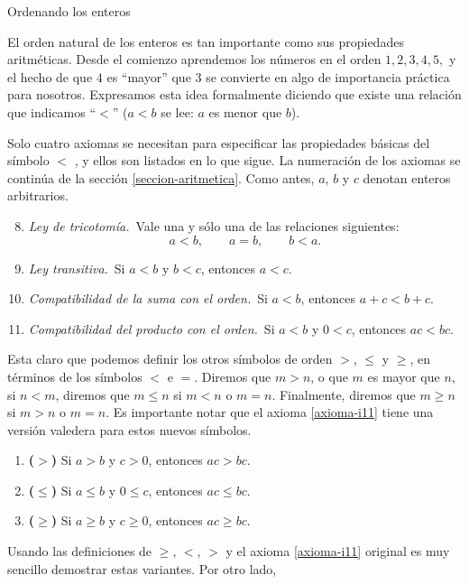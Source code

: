 \begin{section}{Ordenando los enteros}\label{seccion-ordenando-los-enteros}

El orden natural de los enteros es tan importante como sus propiedades aritméticas. Desde el comienzo aprendemos los números en el orden $1, 2, 3, 4, 5,$ y el hecho de que $4$ es ``mayor'' que $3$ se convierte en algo de importancia práctica para nosotros. Expresamos esta idea formalmente diciendo que existe una relación que indicamos ``$<$'' ($a < b$ se lee: $a$ es menor que $b$). 

Solo cuatro axiomas se necesitan para especificar las propiedades básicas del símbolo $<$ , y ellos son listados en lo que sigue. La numeración de los axiomas se continúa de la sección \ref{seccion-aritmetica}. Como antes, $a$, $b$ y $c$ denotan enteros arbitrarios.

\begin{enumerate}[label=\textbf{I\arabic*)}, ref=\textbf{I\arabic*}]
    \setcounter{enumi}{7}
    \item \label{axioma-i8} \textit{Ley de tricotomía.}\, Vale una y sólo una de las relaciones
siguientes:
$$
a<b, \qquad a = b, \qquad b < a.
$$
\item \label{axioma-i9} \textit{Ley transitiva.}\, Si $a< b$ y $b < c$, entonces $a<c$.
\item \label{axioma-i10} \textit{Compatibilidad de la suma con el orden.}\, Si $a < b$, entonces $a+c < b+c$. 
\item \label{axioma-i11} \textit{Compatibilidad del producto con el orden.}\, Si $a< b$ y $0< c$, entonces $ac < bc$. 
\end{enumerate}


Esta claro que podemos definir los otros símbolos de orden $>$, $\le$ y $\ge$, en términos de los símbolos $<$ e $=$. Diremos que $m>n$, o que $m$ es mayor que $n$, si  $n<m$, diremos que $m \le n$ si $m<n$ o $m=n$. Finalmente, diremos que $m \ge n$ si $m > n$ o $m=n$.  Es importante notar que el  axioma \ref{axioma-i11} tiene una versión valedera para estos nuevos símbolos.
\begin{enumerate}[label=\textit{\alph*)}]
\item \textbf{($>$)} Si $a > b$ y $c>0$, entonces $ac > bc$.
\item \textbf{($\le$)} Si $a \le b$ y $0 \le c$, entonces $ac \le bc$.
\item \textbf{($\ge$)} Si $a\ge b$ y $c\ge 0$, entonces $ac \ge bc$.
\end{enumerate}
Usando las definiciones de $\ge$, $<$, $>$ y el axioma \ref{axioma-i11} original es muy sencillo demostrar estas variantes. Por otro lado,


\end{section}
